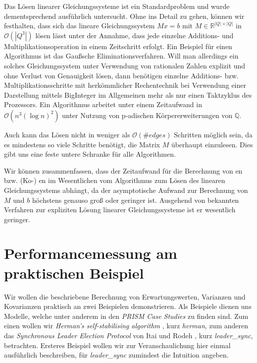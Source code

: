 \documentclass[a4paper]{article}
\theoremstyle{nonumberplain}
\begin{document}
	Das Lösen linearer Gleichungssysteme ist ein Standardproblem und wurde dementsprechend ausführlich untersucht. Ohne ins Detail zu gehen, können wir festhalten, dass sich das lineare Gleichungssystem $Mx = b$ mit $M \in \mathbb{R}^{|Q|\times|Q|}$  in $\mathcal{O}(|Q^3|)$ lösen lässt unter der Annahme, dass jede einzelne Additions- und Multiplikationsoperation in einem Zeitschritt erfolgt. Ein Beispiel für einen Algorithmus ist das Gaußsche Eliminationsverfahren. Will man allerdings ein solches Gleichungssystem unter Verwendung von rationalen Zahlen explizit und ohne Verlust von Genauigkeit lösen, dann benötigen einzelne Additions- bzw. Multiplikationsschritte mit herkömmlicher Rechentechnik bei Verwendung einer Darstellung mittels BigInteger im Allgemeinen mehr als nur einen Taktzyklus des Prozessors. Ein Algorithmus \cite{Dixon1982} arbeitet unter einem Zeitaufwand in $\mathcal{O}(n^3(\log n)^2)$ unter Nutzung von p-adischen Körper\-er\-wei\-ter\-ung\-en von $\mathbb{Q}$.
	
	Auch kann das Lösen nicht in weniger als $\mathcal{O}(\#edges)$ Schritten möglich sein, da es mindestens so viele Schritte benötigt, die Matrix $M$ überhaupt einzulesen. Dies gibt uns eine feste untere Schranke für alle Algorithmen. 
	
	Wir können zusammenfassen, dass der Zeitaufwand für die Berechnung von \expect{}en bzw. (Ko-) \var{}en im Wesentlichen vom Algorithmus zum Lösen des linearen Gleichungssystems abhängt, da der asymptotische Aufwand zur Berechnung von $M$ und $b$ höchstens genauso groß oder geringer ist. Ausgehend von bekannten Verfahren zur expliziten Lösung linearer Gleichungssysteme ist er wesentlich geringer.
	
	
	\section{Performancemessung am praktischen Beispiel}
	
	Wir wollen die beschriebene Berechnung von Erwartungswerten, Varianzen und Kovarianzen praktisch an zwei Beispielen demonstrieren. Als Beispiele dienen uns Modelle, welche unter anderem in den \textit{PRISM Case Studies} \cite{PRISMCS} zu finden sind. Zum einen wollen wir \textit{Herman's self-stabilising algorithm} \cite{Her90}, kurz \textit{herman}, zum anderen das \textit{Synchronous Leader Election Protocol} von Itai und Rodeh \cite{IR90}, kurz \textit{leader\_sync}, betrachten. Ersteres Beispiel wollen wir zur Veranschaulichung hier einmal ausführlich beschreiben, für \textit{leader\_sync} zumindest die Intuition angeben.
	
\end{document}
